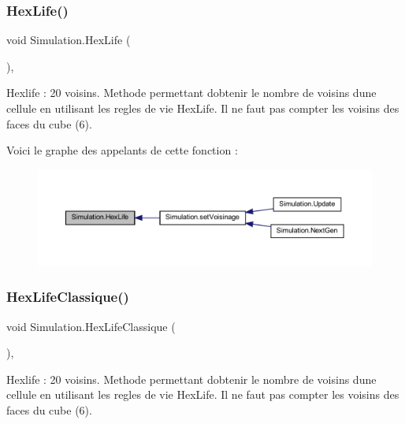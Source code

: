 \subsubsection{\texorpdfstring{Hex\+Life()}{HexLife()}}
{\footnotesize\ttfamily void Simulation.\+Hex\+Life (\begin{DoxyParamCaption}{ }\end{DoxyParamCaption})\hspace{0.3cm}{\ttfamily [inline]}, {\ttfamily [private]}}



Hexlife \+: 20 voisins. Methode permettant d\textquotesingle{}obtenir le nombre de voisins d\textquotesingle{}une cellule en utilisant les regles de vie Hex\+Life. Il ne faut pas compter les voisins des faces du cube (6). 

Voici le graphe des appelants de cette fonction \+:
\nopagebreak
\begin{figure}[H]
\begin{center}
\leavevmode
\includegraphics[width=350pt]{class_simulation_ade3470a637773f3e751ce4b0923c3909_icgraph}
\end{center}
\end{figure}
\mbox{\label{class_simulation_a20934920a4fc75fa258a85d0c4e6968e}} 
\subsubsection{\texorpdfstring{Hex\+Life\+Classique()}{HexLifeClassique()}}
{\footnotesize\ttfamily void Simulation.\+Hex\+Life\+Classique (\begin{DoxyParamCaption}{ }\end{DoxyParamCaption})\hspace{0.3cm}{\ttfamily [inline]}, {\ttfamily [private]}}



Hexlife \+: 20 voisins. Methode permettant d\textquotesingle{}obtenir le nombre de voisins d\textquotesingle{}une cellule en utilisant les regles de vie Hex\+Life. Il ne faut pas compter les voisins des faces du cube (6). 

